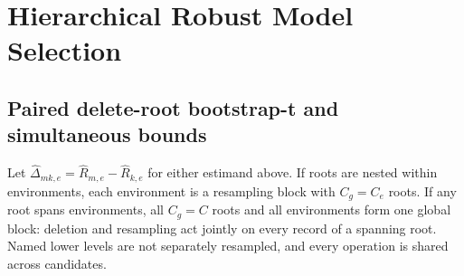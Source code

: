 \documentclass{article}
\begin{document}
\section{Hierarchical Robust Model Selection}
\label{sec:method}

\subsection{Paired delete-root bootstrap-t and simultaneous bounds}

Let $\widehat\Delta_{mk,e}=\widehat R_{m,e}-\widehat R_{k,e}$ for either estimand above.  If roots are nested within environments, each environment is a resampling block with $C_g=C_e$ roots.  If any root spans environments, all $C_g=C$ roots and all environments form one global block: deletion and resampling act jointly on every record of a spanning root.  Named lower levels are not separately resampled, and every operation is shared across candidates.
\end{document}
